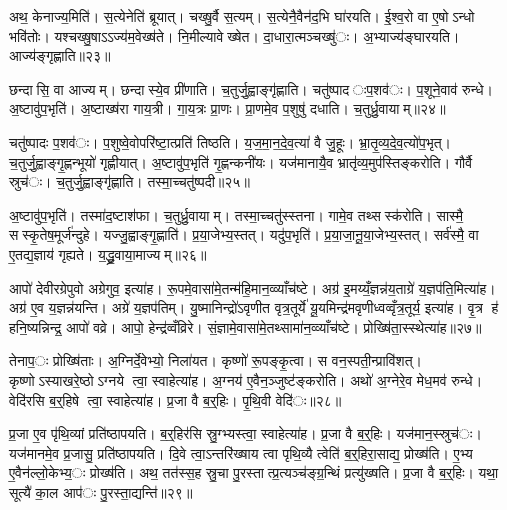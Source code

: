 अथ॒ केनाज्य॒मिति॑। स॒त्येनेति॑ ब्रूयात्। चख्षु॒र्वै स॒त्यम्। स॒त्येनै॒वैन॑द॒भि घा॑रयति। ई॒श्व॒रो वा ए॒षोऽन्धो भवि॑तोः। यश्चख्षु॒षाऽऽज्य॑म॒वेख्ष॑ते। नि॒मील्यावेख्षेत। दा॒धारा॒त्मञ्चख्षु॑ः। अ॒भ्याज्य॑ङ्घारयति। आज्य॑ङ्गृह्णाति॥२३॥

छन्दासि॒ वा आज्यम्। छन्दास्ये॒व प्री॑णाति। च॒तुर्जु॒ह्वाङ्गृ॑ह्णाति। चतु॑ष्पाद ःप॒शव॑ः। प॒शूने॒वाव॑ रुन्धे। अ॒ष्टावु॑प॒भृति॑। अ॒ष्टाख्ष॑रा गाय॒त्री। गा॒य॒त्रः प्रा॒णः। प्रा॒णमे॒व प॒शुषु॑ दधाति। च॒तुर्ध्रु॒वायाम्॥२४॥

चतु॑ष्पादः प॒शव॑ः। प॒शुष्वे॒वोपरि॑ष्टा॒त्प्रति॑ तिष्ठति। य॒ज॒मा॒न॒दे॒व॒त्या॑ वै जु॒हूः। भ्रा॒तृ॒व्य॒दे॒व॒त्यो॑प॒भृत्। च॒तुर्जु॒ह्वाङ्गृ॒ह्णन्भूयो॑ गृह्णीयात्। अ॒ष्टावु॑प॒भृति॑ गृ॒ह्णन्कनी॑यः। यज॑मानायै॒व भ्रातृ॑व्य॒मुप॑स्तिङ्करोति। गौर्वै स्रुच॑ः। च॒तुर्जु॒ह्वाङ्गृ॑ह्णाति। तस्मा॒च्चतु॑ष्पदी॥२५॥

अ॒ष्टावु॑प॒भृति॑। तस्मा॑द॒ष्टाश॑फा। च॒तुर्ध्रु॒वायाम्। तस्मा॒च्चतु॑स्स्तना। गामे॒व तथ्सस्क॑रोति। सास्मै॒ सस्कृ॒तेष॒मूर्ज॑न्दुहे। यज्जु॒ह्वाङ्गृ॒ह्णाति॑। प्र॒या॒जेभ्य॒स्तत्। यदु॑प॒भृति॑। प्र॒या॒जा॒नू॒या॒जेभ्य॒स्तत्। सर्व॑स्मै॒ वा ए॒तद्य॒ज्ञाय॑ गृह्यते। य॒द्ध्रु॒वाया॒माज्यम्॥२६॥


आपो॑ देवीरग्रेपुवो अग्रेगुव॒ इत्या॑ह। रू॒पमे॒वासा॑मे॒तन्म॑हि॒मान॒व्व्याँच॑ष्टे। अग्र॑ इ॒मय्यँ॒ज्ञन्न॑य॒ताग्रे॑ य॒ज्ञप॑ति॒मित्या॑ह। अग्र॑ ए॒व य॒ज्ञन्न॑यन्ति। अग्रे॑ य॒ज्ञप॑तिम्। यु॒ष्मानिन्द्रो॑ऽवृणीत वृत्र॒तूर्ये॑ यू॒यमिन्द्र॑मवृणीध्वव्वृँत्र॒तूर्य॒ इत्या॑ह। वृ॒त्र ह॑ हनि॒ष्यन्निन्द्र॒ आपो॑ वव्रे। आपो॒ हेन्द्र॑व्वँव्रिरे। सं॒ज्ञामे॒वासा॑मे॒तथ्सामा॑न॒व्व्याँच॑ष्टे। प्रोख्षि॑ता॒स्स्थेत्या॑ह॥२७॥

तेनाप॒ः प्रोख्षि॑ताः। अ॒ग्निर्दे॒वेभ्यो॒ निला॑यत। कृष्णो॑ रू॒पङ्कृ॒त्वा। स वन॒स्पती॒न्प्रावि॑शत्। कृष्णोऽस्याखरे॒ष्ठोऽग्नये त्वा॒ स्वाहेत्या॑ह। अ॒ग्नय॑ ए॒वैन॒ञ्जुष्ट॑ङ्करोति। अथो॑ अ॒ग्नेरे॒व मेध॒मव॑ रुन्धे। वेदि॑रसि ब॒र्॒हिषे त्वा॒ स्वाहेत्या॑ह। प्र॒जा वै ब॒र्॒हिः। पृ॒थि॒वी वेदि॑ः॥२८॥

प्र॒जा ए॒व पृ॑थि॒व्यां प्रति॑ष्ठापयति। ब॒र्॒हिर॑सि स्रु॒ग्भ्यस्त्वा॒ स्वाहेत्या॑ह। प्र॒जा वै ब॒र्॒हिः। यज॑मान॒स्स्रुच॑ः। यज॑मानमे॒व प्र॒जासु॒ प्रति॑ष्ठापयति। दि॒वे त्वा॒ऽन्तरि॑ख्षाय त्वा पृथि॒व्यै त्वेति॑ ब॒र्॒हिरा॒साद्य॒ प्रोख्ष॑ति। ए॒भ्य ए॒वैन॑ल्लो॒केभ्य॒ः प्रोख्ष॑ति। अथ॒ तत॑स्स॒ह स्रु॒चा पु॒रस्तात्प्र॒त्यञ्च॑ङ्ग्र॒न्थिं प्रत्यु॑ख्षति। प्र॒जा वै ब॒र्॒हिः। यथा॒ सूत्यै॑ का॒ल आप॑ः पु॒रस्ता॒द्यन्ति॑॥२९॥


